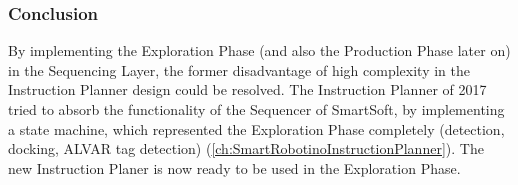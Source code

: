 \subsubsection{Conclusion }

By implementing the Exploration Phase (and also the Production Phase later on) in the Sequencing Layer, the former disadvantage of high complexity in the Instruction Planner design could be resolved. The Instruction Planner of 2017 tried to absorb the functionality of the Sequencer of SmartSoft, by implementing a state machine, which represented the Exploration Phase completely (detection, docking, ALVAR tag detection) (\ref{ch:SmartRobotinoInstructionPlanner}).
The new Instruction Planer is now ready to be used in the Exploration Phase. 

